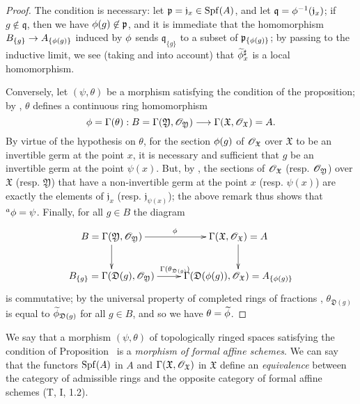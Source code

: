 \begin{proof}
The condition is necessary: let $\mathfrak{p}=\mathfrak{j}_x\in\operatorname{Spf}(A)$, and let $\mathfrak{q}=\phi^{-1}(\mathfrak{j}_x)$; if $g\not\in\mathfrak{q}$, then we have $\phi(g)\not\in\mathfrak{p}$, and it is immediate that the homomorphism
$B_{\{g\}}\to A_{\{\vphi(g)\}}$ induced by $\phi$  sends $\mathfrak{q}_{\{g\}}$ to a subset of $\mathfrak{p}_{\{\phi(g)\}}$; by passing to the inductive limit, we see (taking  and  into account) that $\widetilde{\phi}_x^\sharp$ is a local homomorphism.

Conversely, let $(\psi,\theta)$ be a morphism satisfying the condition of the proposition;
by , $\theta$ defines a continuous ring homomorphism
\[
  \vphi=\Gamma(\theta):B=\Gamma(\mathfrak{Y},\sh{O}_\mathfrak{Y})\to\Gamma(\mathfrak{X},\sh{O}_\mathfrak{X})=A.
\]
By virtue of the hypothesis on $\theta$, for the section $\phi(g)$ of $\mathscr{O}_\mathfrak{X}$ over $\mathfrak{X}$ to be an invertible germ at the point $x$, it is necessary and sufficient that $g$ be an invertible germ at the point $\psi(x)$.
But, by , the sections of $\mathscr{O}_\mathfrak{X}$ (resp. $\mathscr{O}_\mathfrak{Y}$) over $\mathfrak{X}$ (resp. $\mathfrak{Y}$) that have a non-invertible germ at the point $x$ (resp. $\psi(x)$) are exactly the elements of $\mathfrak{j}_x$
(resp. $\mathfrak{j}_{\psi(x)}$);
the above remark thus shows that ${}^a\phi=\psi$.
Finally, for all $g\in B$ the diagram
\[
  \xymatrix{
    B=\Gamma(\mathfrak{Y},\sh{O}_\mathfrak{Y})\ar[r]^\vphi\ar[d] &
    \Gamma(\mathfrak{X},\sh{O}_\mathfrak{X})=A\ar[d]\\
    B_{\{g\}}=\Gamma(\mathfrak{D}(g),\sh{O}_\mathfrak{Y})\ar[r]^{\Gamma(\theta_{\mathfrak{D}(g)})} &
    \Gamma(\mathfrak{D}(\vphi(g)),\sh{O}_\mathfrak{X})=A_{\{\vphi(g)\}}
  }
\]
is commutative; by the universal property of completed rings of fractions , $\theta_{\mathfrak{D}(g)}$ is equal to $\widetilde{\phi}_{\mathfrak{D}(g)}$ for all $g\in B$, and so  we have $\theta=\widetilde{\phi}$.
\end{proof}

We say that a morphism $(\psi,\theta)$ of topologically ringed spaces satisfying the condition of Proposition~ is a \emph{morphism of formal affine schemes}.
We can say that the functors $\operatorname{Spf}(A)$ in $A$ and $\Gamma(\mathfrak{X},\mathscr{O}_\mathfrak{X})$ in $\mathfrak{X}$ define an \emph{equivalence} between the category of admissible rings and the opposite category of formal affine schemes (T, I, 1.2).

